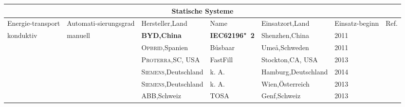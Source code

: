 \begin{table}\centering
	\begin{tabularx}{\linewidth}{p{1.5cm}p{1.9cm}p{2.2cm}Xp{2.4cm}p{1.0cm}l}
		                                                                                    \multicolumn{7}{c}{\textbf{Statische Systeme}}                                                                                     \\ \toprule
		Energie-transport                & Automati-sierungsgrad         & Hersteller,\newline Land                         & Name                 & Einsatzort,\newline Land        & Einsatz-beginn & Ref.                   \\ \midrule
		\multirow{16}{*}{konduktiv}      & \multirow{2}{*}{manuell}      & \textbf{\textsc{BYD},\newline China}             & \textbf{IEC62196"~2} & Shenzhen,\newline China         & 2011           & \cite{bydSpecs}        \\
		\cmidrule{2-7}                   & \multirow{14}{*}{automatisch} & \textsc{Opbrid},\newline Spanien                 & Bůsbaar              & Umeå,\newline Schweden          & 2011           & \cite{SchKonLade}      \\
		                                 &                               & \textsc{Proterra,\newline SC, USA}               & FastFill             & Stockton,\newline CA, USA       & 2013           & \cite{protCat}         \\
		                                 &                               & \textsc{Siemens},\newline Deutschland            & k. A.                & Hamburg,\newline Deutschland    & 2014           & \cite{siemensHamburg}  \\
		                                 &                               & \textsc{Siemens},\newline Deutschland            & k. A.                & Wien,\newline Österreich        & 2013           & \cite{SiemensWien}     \\
		                                 &                               & \textsc{ABB},\newline Schweiz                    & TOSA                 & Genf,\newline Schweiz           & 2013           & \cite{tosa}            \\

\end{tabularx}
\end{table}
